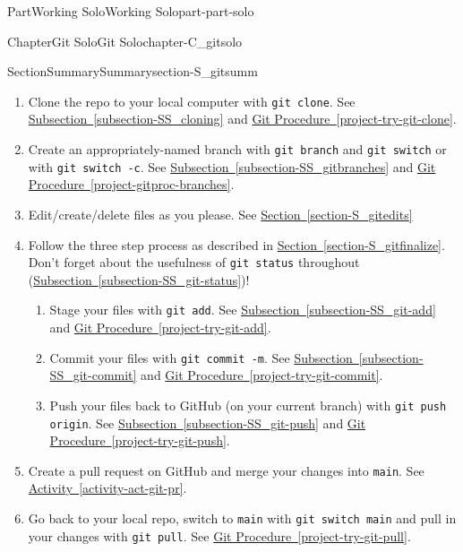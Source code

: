 \documentclass[oneside,10pt,]{book}
\newcommand{\xreffont}{\relax}
\newcommand{\mono}[1]{\texttt{#1}}
\begin{document}
\begin{partptx}{Part}{Working Solo}{}{Working Solo}{}{}{part-part-solo}
\begin{chapterptx}{Chapter}{Git Solo}{}{Git Solo}{}{}{chapter-C_gitsolo}
\begin{sectionptx}{Section}{Summary}{}{Summary}{}{}{section-S_gitsumm}
\begin{enumerate}
\item{}Clone the repo to your local computer with \mono{git clone}. See \hyperref[subsection-SS_cloning]{Subsection~{\xreffont\ref{subsection-SS_cloning}}} and \hyperref[project-try-git-clone]{Git Procedure~{\xreffont\ref{project-try-git-clone}}}.%
\item{}Create an appropriately-named branch with \mono{git branch} and \mono{git switch} or with \mono{git switch -c}. See \hyperref[subsection-SS_gitbranches]{Subsection~{\xreffont\ref{subsection-SS_gitbranches}}} and \hyperref[project-gitproc-branches]{Git Procedure~{\xreffont\ref{project-gitproc-branches}}}.%
\item{}Edit\slash{}create\slash{}delete files as you please. See \hyperref[section-S_gitedits]{Section~{\xreffont\ref{section-S_gitedits}}}%
\item{}Follow the three step process as described in \hyperref[section-S_gitfinalize]{Section~{\xreffont\ref{section-S_gitfinalize}}}. Don't forget about the usefulness of \mono{git status} throughout (\hyperref[subsection-SS_git-status]{Subsection~{\xreffont\ref{subsection-SS_git-status}}})!%
\begin{enumerate}
\item{}Stage your files with \mono{git add}. See \hyperref[subsection-SS_git-add]{Subsection~{\xreffont\ref{subsection-SS_git-add}}} and \hyperref[project-try-git-add]{Git Procedure~{\xreffont\ref{project-try-git-add}}}.%
\item{}Commit your files with \mono{git commit -m}. See \hyperref[subsection-SS_git-commit]{Subsection~{\xreffont\ref{subsection-SS_git-commit}}} and \hyperref[project-try-git-commit]{Git Procedure~{\xreffont\ref{project-try-git-commit}}}.%
\item{}Push your files back to GitHub (on your current branch) with \mono{git push origin}. See \hyperref[subsection-SS_git-push]{Subsection~{\xreffont\ref{subsection-SS_git-push}}} and \hyperref[project-try-git-push]{Git Procedure~{\xreffont\ref{project-try-git-push}}}.%
\end{enumerate}
%
\item{}Create a pull request on GitHub and merge your changes into \mono{main}. See \hyperref[activity-act-git-pr]{Activity~{\xreffont\ref{activity-act-git-pr}}}.%
\item{}Go back to your local repo, switch to \mono{main} with \mono{git switch main} and pull in your changes with \mono{git pull}. See \hyperref[project-try-git-pull]{Git Procedure~{\xreffont\ref{project-try-git-pull}}}.%
\end{enumerate}

\end{sectionptx}
\end{chapterptx}
\end{partptx}
\end{document}
